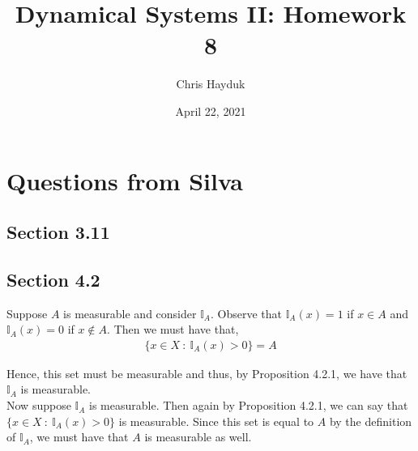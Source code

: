 \documentclass[12pt]{article}
\newenvironment{problem}[2][Problem]{\begin{trivlist}
\item[\hskip \labelsep {\bfseries #1}\hskip \labelsep {\bfseries #2.}]}{\end{trivlist}}
\begin{document}
\title{Dynamical Systems II: Homework 8}

\author{Chris Hayduk}
\date{April 22, 2021}

\maketitle

\section{Questions from Silva}

\subsection{Section 3.11}

\begin{problem}{3}
\end{problem}


\subsection{Section 4.2}

\begin{problem}{3}
\end{problem}

Suppose $A$ is measurable and consider $\mathbb{I}_A$. Observe that $\mathbb{I}_A(x) = 1$ if $x \in A$ and $\mathbb{I}_A(x) = 0$ if $x \not\in A$. Then we must have that,
\begin{align*}
\{x \in X \ : \ \mathbb{I}_A(x) > 0\} = A
\end{align*}

Hence, this set must be measurable and thus, by Proposition 4.2.1, we have that $\mathbb{I}_A$ is measurable.\\

Now suppose $\mathbb{I}_A$ is measurable. Then again by Proposition 4.2.1, we can say that $\{x \in X \ : \ \mathbb{I}_A(x) > 0\}$ is measurable. Since this set is equal to $A$ by the definition of $\mathbb{I}_A$, we must have that $A$ is measurable as well.

\begin{problem}{5}
\end{problem}

\begin{problem}{6}
\end{problem}
\end{document}
